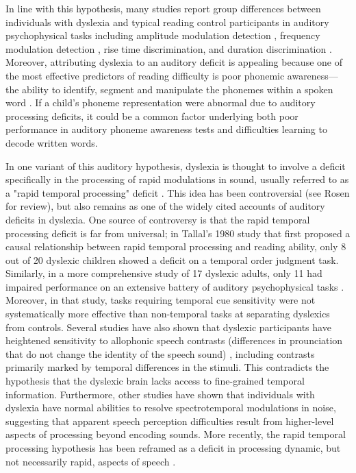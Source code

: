 \documentclass[../uwthesis.tex]{subfiles}
\begin{document}
In line with this hypothesis, many studies report group differences between individuals with dyslexia and typical reading control participants in auditory psychophysical tasks including amplitude modulation detection \citep{Hamalainen2013, McAnally1997,Menell1999,Rocheron2002,Witton1998}, frequency modulation detection \citep{Boets2007,Dawes2009,Gibson2006,Stoodley2006,Witton2002}, rise time discrimination, and duration discrimination \citep{Banai2004,Banai2006,Goswami2011,Thomson2006,Thomson2008}. Moreover, attributing dyslexia to an auditory deficit is appealing because one of the most effective predictors of reading difficulty is poor phonemic awareness---the ability to identify, segment and manipulate the phonemes within a spoken word \citep{Bus1999,Hulme2002}. If a child's phoneme representation were abnormal due to auditory processing deficits, it could be a common factor underlying both poor performance in auditory phoneme awareness tests and difficulties learning to decode written words.

In one variant of this auditory hypothesis, dyslexia is thought to involve a deficit specifically in the processing of rapid modulations in sound, usually referred to as a "rapid temporal processing" deficit \citep{Merzenich1996,Tallal1980,Tallal1996h}. This idea has been controversial (see Rosen \citep{Rosen2003} for review), but also remains as one of the widely cited accounts of auditory deficits in dyslexia. One source of controversy is that the rapid temporal processing deficit is far from universal; in Tallal's 1980 study \citep{Tallal1980} that first proposed a causal relationship between rapid temporal processing and reading ability, only 8 out of 20 dyslexic children showed a deficit on a temporal order judgment task. Similarly, in a more comprehensive study of 17 dyslexic adults, only 11 had impaired performance on an extensive battery of auditory psychophysical tasks \citep{Ramus2003}. Moreover, in that study, tasks requiring temporal cue sensitivity were not systematically more effective than non-temporal tasks at separating dyslexics from controls. Several studies have also shown that dyslexic participants have heightened sensitivity to allophonic speech contrasts (differences in prounciation that do not change the identity of the speech sound) \citep{Bogliotti2008,Noordenbos2015,Serniclaes2004}, including contrasts primarily marked by temporal differences in the stimuli. This contradicts the hypothesis that the dyslexic brain lacks access to fine-grained temporal information. Furthermore, other studies have shown that individuals with dyslexia have normal abilities to resolve spectrotemporal modulations in noise, suggesting that apparent speech perception difficulties result from higher-level aspects of processing beyond encoding sounds. \citep{Calcus2018,Dole2012,Ziegler2009} More recently, the rapid temporal processing hypothesis has been reframed as a deficit in processing dynamic, but not necessarily rapid, aspects of speech \citep{Boets2011,Law2014a,Poelmans2011}.
\end{document}
